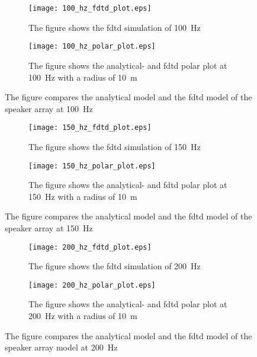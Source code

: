 \begin{figure}[H]
\centering
\begin{subfigure}[htbp]{0.55\textwidth}
		\texttt{[image: 100\_hz\_fdtd\_plot.eps]}
		\caption{The figure shows the \gls{fdtd} simulation of \SI{100}{\hertz}}
		\label{fig:fdtd_100_Hz}
\end{subfigure}
\begin{subfigure}[htbp]{0.35\textwidth}
		\texttt{[image: 100\_hz\_polar\_plot.eps]}
		\caption{The figure shows the analytical- and \gls{fdtd} polar plot at \SI{100}{\hertz} with a radius of \SI{10}{\meter}}
		\label{fig:polar_100_Hz}
\end{subfigure} 
\caption{The figure compares the analytical model and the \gls{fdtd} model of the speaker array at \SI{100}{\hertz}}
\end{figure}


\begin{figure}[H]
\centering
\begin{subfigure}[htbp]{0.55\textwidth}
		\texttt{[image: 150\_hz\_fdtd\_plot.eps]}
		\caption{The figure shows the \gls{fdtd} simulation of \SI{150}{\hertz}}
		\label{fig:fdtd_150_Hz}
\end{subfigure}
\begin{subfigure}[htbp]{0.35\textwidth}
		\texttt{[image: 150\_hz\_polar\_plot.eps]}
		\caption{The figure shows the analytical- and \gls{fdtd} polar plot at \SI{150}{\hertz} with a radius of \SI{10}{\meter}}
		\label{fig:polar_150_Hz}
\end{subfigure} 
\caption{The figure compares the analytical model and the \gls{fdtd} model of the speaker array at \SI{150}{\hertz}}
\end{figure}


\begin{figure}[H]
\centering
\begin{subfigure}[htbp]{0.55\textwidth}
		\texttt{[image: 200\_hz\_fdtd\_plot.eps]}
		\caption{The figure shows the \gls{fdtd} simulation of \SI{200}{\hertz}}
		\label{fig:fdtd_200_Hz}
\end{subfigure}
\begin{subfigure}[htbp]{0.35\textwidth}
		\texttt{[image: 200\_hz\_polar\_plot.eps]}
		\caption{The figure shows the analytical- and \gls{fdtd} polar plot at \SI{200}{\hertz} with a radius of \SI{10}{\meter}}
		\label{fig:polar_200_Hz}
\end{subfigure} 
\caption{The figure compares the analytical model and the \gls{fdtd} model of the speaker array model at \SI{200}{\hertz}}
\end{figure}


